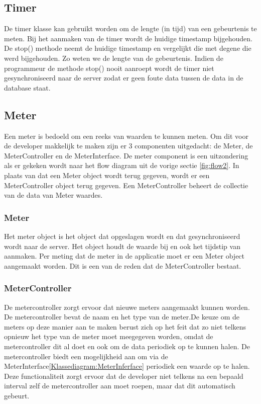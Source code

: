 \subsection{Timer}
De timer klasse kan gebruikt worden om de lengte (in tijd) van een gebeurtenis te meten. Bij het aanmaken van de timer wordt de huidige timestamp bijgehouden. De stop() methode neemt de huidige timestamp en vergelijkt die met degene die werd bijgehouden. Zo weten we de lengte van de gebeurtenis. Indien de programmeur de methode stop() nooit aanroept wordt de timer niet gesynchroniseerd naar de server zodat er geen foute data tussen de data in de database staat. 

\subsection{Meter}
Een meter is bedoeld om een reeks van waarden te kunnen meten. Om dit voor de developer makkelijk te maken zijn er  3 componenten uitgedacht: de Meter, de MeterController en de MeterInterface. De meter component is een uitzondering als er gekeken wordt naar het flow diagram uit de vorige sectie \ref{fig:flow2}. In plaats van dat een Meter object wordt terug gegeven, wordt er een MeterController object terug gegeven. Een MeterController beheert de collectie van de data van Meter waardes. 

\subsubsection{Meter}
Het meter object is het object dat opgeslagen wordt en dat gesynchroniseerd wordt naar de server. Het object houdt de waarde bij en ook het tijdstip van aanmaken. Per meting dat de meter in de applicatie moet er een Meter object aangemaakt worden. Dit is een van de reden dat de MeterController bestaat. 

\subsubsection{MeterController}
De metercontroller zorgt ervoor dat nieuwe meters aangemaakt kunnen worden. De metercontroller bevat de naam en het type van de meter.De keuze om de meters op deze manier aan te maken berust zich op het feit dat zo niet telkens opnieuw het type van de meter moet meegegeven worden, omdat de metercontroller dit al doet en ook om de data periodiek op te kunnen halen. De metercontroller biedt een mogelijkheid aan om via de MeterInterface\ref{Klassediagram:MeterInferface} periodiek een waarde op te halen. Deze functionaliteit zorgt ervoor dat de developer niet telkens na een bepaald interval zelf de metercontroller aan moet roepen, maar dat dit automatisch gebeurt.


